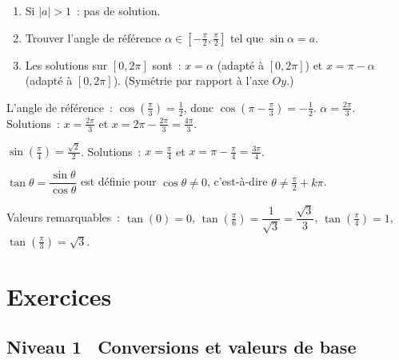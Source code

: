 \begin{methode}[R\'esoudre $\sin x = a$ sur {$[0, 2\pi]$}]
\begin{enumerate}
  \item Si $|a|>1$~: pas de solution.
  \item Trouver l'angle de r\'ef\'erence $\alpha\in[-\frac{\pi}{2},\frac{\pi}{2}]$ tel que $\sin\alpha=a$.
  \item Les solutions sur $[0,2\pi]$ sont~: $x=\alpha$ (adapt\'e \`a $[0,2\pi]$)
        et $x=\pi-\alpha$ (adapt\'e \`a $[0,2\pi]$).
        (Sym\'etrie par rapport \`a l'axe $Oy$.)
\end{enumerate}
\end{methode}

\begin{ex}[R\'esoudre $\cos x = -\frac{1}{2}$ sur {$[0, 2\pi]$}]
L'angle de r\'ef\'erence~: $\cos(\frac{\pi}{3})=\frac{1}{2}$, donc $\cos(\pi-\frac{\pi}{3})=-\frac{1}{2}$.
$\alpha = \frac{2\pi}{3}$.
Solutions~: $x = \frac{2\pi}{3}$ et $x = 2\pi - \frac{2\pi}{3} = \frac{4\pi}{3}$.
\end{ex}

\begin{ex}[R\'esoudre $\sin x = \frac{\sqrt{2}}{2}$ sur {$[0, 2\pi]$}]
$\sin(\frac{\pi}{4})=\frac{\sqrt{2}}{2}$.
Solutions~: $x = \frac{\pi}{4}$ et $x = \pi - \frac{\pi}{4} = \frac{3\pi}{4}$.
\end{ex}

\begin{defn}
$\tan\theta = \dfrac{\sin\theta}{\cos\theta}$ est d\'efinie pour $\cos\theta\ne0$,
c'est-\`a-dire $\theta\ne\frac{\pi}{2}+k\pi$.

\medskip\noindent
Valeurs remarquables~:
$\tan(0)=0$,\;
$\tan(\frac{\pi}{6})=\dfrac{1}{\sqrt{3}}=\dfrac{\sqrt{3}}{3}$,\;
$\tan(\frac{\pi}{4})=1$,\;
$\tan(\frac{\pi}{3})=\sqrt{3}$.
\end{defn}

\section{Exercices}

\subsection*{\quad Niveau 1 \textemdash\ Conversions et valeurs de base}

